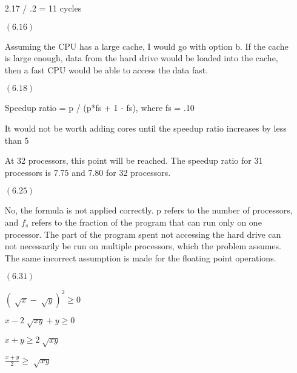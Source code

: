 \documentclass[letterpaper,10pt,titlepage]{article}
\begin{document}
\begin{enumerate}
  2.17 / .2 = 11 cycles
  
\item[$(6.16)$]
  
  Assuming the CPU has a large cache, I would go with option b.
  If the cache is large enough, data from the hard drive would be loaded into the cache, then a fast CPU would be able to access the data fast.

\item[$(6.18)$]

  Speedup ratio = p / (p*fs + 1 - fs), where fs = .10
  
  It would not be worth adding cores until the speedup ratio increases by less than 5%
  
  At 32 processors, this point will be reached.
  The speedup ratio for 31 processors is 7.75 and 7.80 for 32 processors.
  
\item[$(6.25)$]
  
  No, the formula is not applied correctly.
  p refers to the number of processors, and $f_{s}$ refers to the fraction of the program that can run only on one processor.
  The part of the program spent not accessing the hard drive can not necessarily be run on multiple processors, which the problem assumes.
  The same incorrect assumption is made for the floating point operations.
  
\item[$(6.31)$]

  $(\sqrt[]{x} - \sqrt[]{y})^2  \geq  0$
  
  $x - 2\sqrt[]{xy} + y  \geq  0$
  
  $x + y  \geq  2\sqrt[]{xy}$
  
  $\frac{x + y}{2}  \geq  \sqrt[]{xy}$

\end{enumerate}
\end{document}
